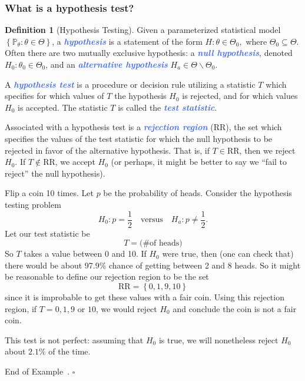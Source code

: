 \documentclass[10pt]{article}
\theoremstyle{definition}
\newtheorem{definition}[theorem]{Definition}
\newtheorem{example}[theorem]{Example}
\renewenvironment{example}
{\begin{oldexample}}
  {\par\smallskip\hfill   End of Example~\theexample. $\square$    \par\end{oldexample}}
\newcommand{\1}[1]{\textbf{1}_{\left[#1\right]}} %
\def\P{\mathbb{P}} %
\newcommand{\demph}[1]{\textcolor{RoyalBlue}{\textbf{\slshape #1}}} %
\begin{document}
\subsubsection{What is a hypothesis test?}
\begin{definition}[Hypothesis Testing]
  \label{def:hypothesis-testing}
  Given a parameterized statistical model
  $\left\{\P_{\theta}: \theta\in \Theta\right\}$, a \demph{hypothesis} is a
  statement of the form $H: \theta\in \Theta_{0},$ where
  $\Theta_{0}\subseteq \Theta$. Often there are two mutually exclusive
  hypothesis: a \demph{null hypothesis}, denoted
  $H_{0}: \theta_{0}\in \Theta_{0}$, and an \demph{alternative hypothesis}
  $H_{a}\in \Theta\backslash \Theta_{0}$.

   
  A \demph{hypothesis test} is a procedure or decision rule utilizing a
  statistic $T$ which specifies for which values of $T$ the hypothesis $H_{0}$
  is rejected, and for which values $H_{0}$ is accepted. The statistic $T$ is
  called the \demph{test statistic}.

  Associated with a hypothesis test is a \demph{rejection region} (RR), the
  set which specifies the values of the test statistic for which the null
  hypothesis to be rejected in favor of the alternative hypothesis. That is,
  if $T\in\mathrm{RR}$, then we reject $H_{0}$. If
  $T\notin \mathrm{\mathrm{RR}}$, we accept $H_{0}$ (or perhaps, it might be
  better to say we ``fail to reject'' the null hypothesis).
\end{definition}

\begin{example}[Coin flipping hypothesis test]
  \label{ex:coin-flipping-hypothesis-test}
  Flip a coin 10 times. Let $p$ be the probability of heads. Consider the
  hypothesis testing problem
  \begin{equation*}
    H_{0}: p = \frac{1}{2} \quad \text{versus} \quad H_{a}: p\neq \frac{1}{2}.
  \end{equation*}
  Let our test statistic be
  \begin{equation*}
    T = \text{(\# of heads)}
  \end{equation*}
  So $T$ takes a value between 0 and 10. If $H_{0}$ were true, then (one can
  check that) there would be about 97.9\% chance of getting between 2 and 8
  heads. So it might be reasonable to define our rejection region to be the
  set
  \begin{equation*}
    \text{RR} = \left\{0,1,9,10\right\}
  \end{equation*}
  since it is improbable to get these values with a fair coin. Using this
  rejection region, if $T=0,1,9$ or $10$, we would reject $H_{0}$ and conclude
  the coin is not a fair coin.

  This test is not perfect: assuming that $H_{0}$ is true, we will nonetheless
  reject $H_{0}$ about $2.1\%$ of the time.
\end{example}
\end{document}

